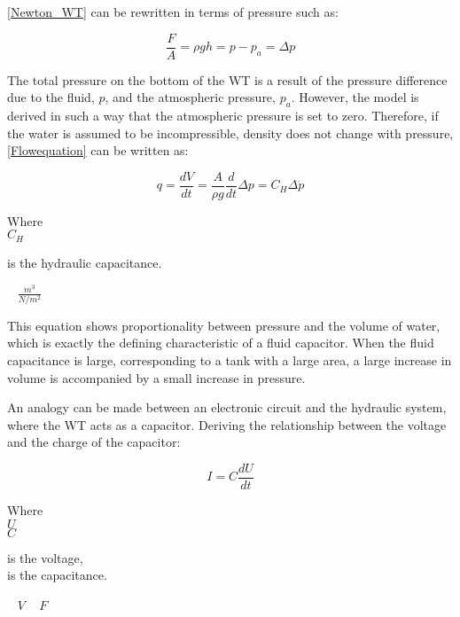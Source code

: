 \eqref{Newton_WT} can be rewritten in terms of pressure such as: 

\begin{equation}
  \frac{F}{A} = \rho g h = p - p_a = \Delta p
  \label{Pressuredifference}
\end{equation}

The total pressure on the bottom of the WT is a result of the pressure difference due to the fluid, $p$, and the atmospheric pressure, $p_a$. However, the model is derived in such a way that the atmospheric pressure is set to zero. Therefore, if the water is assumed to be incompressible, density does not change with pressure, \eqref{Flowequation} can be written as: 

\begin{equation}
q = \frac{dV}{dt} = \frac{A}{\rho g} \frac{d}{dt} \Delta p = C_H \Delta \dot{p}
  \label{FlowConservation}
\end{equation}

\begin{minipage}[t]{0.20\textwidth}
Where\\
\hspace*{8mm} $C_H$ 
\end{minipage}
\begin{minipage}[t]{0.68\textwidth}
\vspace*{2mm}
is the hydraulic capacitance.
\end{minipage}
\begin{minipage}[t]{0.10\textwidth}
\vspace*{2mm}
\textcolor{White}{te}$\unit{\frac{m^3}{N/m^2}}$
\end{minipage}

This equation shows proportionality between pressure and the volume of water, which is exactly the defining characteristic of a fluid capacitor. When the fluid capacitance is large, corresponding to a tank with a large area, a large increase in volume is accompanied by a small increase in pressure. 

An analogy can be made between an electronic circuit and the hydraulic system, where the WT acts as a capacitor.  Deriving the relationship between the voltage and the charge of the capacitor:

\begin{equation}
  I = C \frac{dU}{dt}
  \label{ElecCircuirt}
\end{equation}

\begin{minipage}[t]{0.20\textwidth}
Where\\
\hspace*{8mm} $U$ \\
\hspace*{8mm} $C$ 
\end{minipage}
\begin{minipage}[t]{0.68\textwidth}
\vspace*{2mm}
is the voltage,\\
is the capacitance.
\end{minipage}
\begin{minipage}[t]{0.10\textwidth}
\vspace*{2mm}
\textcolor{White}{te}$\unit{V}$
\textcolor{White}{te}$\unit{F}$
\end{minipage}


